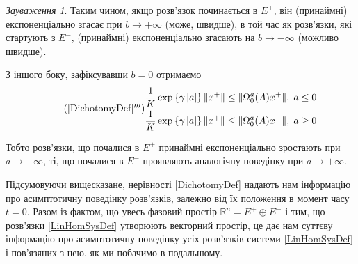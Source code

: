 \documentclass[14pt]{extarticle} %
\theoremstyle{remark}
\newtheorem{remark}{Зауваження}
\begin{document}
\begin{remark}
Таким чином, якщо розв’язок починається в $E^+$, він (принаймні)
експоненціально
згасає при $b\to+\infty$ (може, швидше), в той час як розв’язки, які стартують з $E^-$,
(принаймні) експоненціально згасають на $b\to-\infty$ (можливо швидше).

З іншого боку, зафіксувавши $b=0$ отримаємо
\begin{equation*}
	\tag{\ref*{DichotomyDef}$'''$}
	\begin{aligned}
	\frac{1}{K}\exp\left\{\gamma\myabs{a}\right\}\mynorm{{x}^+}\leq \mynorm{\Omega_0^a(A){x}^+},\; a\leq 0\\
	\frac{1}{K}\exp\left\{\gamma\myabs{a}\right\}\mynorm{{x}^+}\leq \mynorm{\Omega_0^a(A){x}^-},\;a\geq 0\\
\end{aligned}\end{equation*}

Тобто розв’язки, що почалися в $E^+$ принаймні 
експоненціально зростають при $a\to-\infty$, ті, що почалися в $E^-$ проявляють аналогічну поведінку при 
$a\to+\infty$. 

Підсумовуючи вищесказане, нерівності \ref{DichotomyDef} надають нам інформацію про асимптотичну поведінку розв’язків, залежно
від їх положення в момент часу $t=0$. Разом із фактом, що увесь фазовий простір $\mathbb{R}^n=E^+\oplus E^-$ і тим, що 
розв’язки \ref{LinHomSysDef} утворюють векторний простір, це дає нам суттєву інформацію про асимптотичну поведінку усіх розв’язків
системи \ref{LinHomSysDef} і пов’язяних з нею, як ми побачимо в подальшому.
\end{remark}
\end{document}
